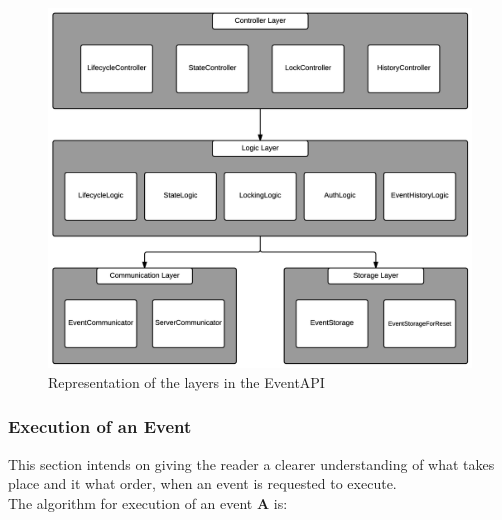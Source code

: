 \begin{figure}[h!]
\centering
\includegraphics[width=0.8\linewidth]{figures/EventLayers}
\caption{\label{fig:EventAPILayer}  Representation of the layers in the EventAPI}
\end{figure}

\subsubsection{Execution of an Event}
This section intends on giving the reader a clearer understanding of what takes place and it what order, when an event is requested to execute.\\

The algorithm for execution of an event \textbf{A} is:

